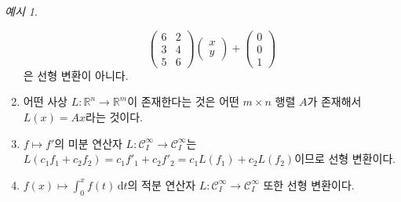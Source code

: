 \documentclass[unfonts,oneside,a4paper]{oblivoir}
\theoremstyle{definition}
\theoremstyle{theorem}
\theoremstyle{remark}
\theoremstyle{remark}
\theoremstyle{remark}
\newtheorem*{example}{예시}
\theoremstyle{remark}
\renewcommand{\vec}[1]{\bm{\mathit{#1}}}
\newcommand{\dd}{\mathrm{d}}
\begin{document}
\begin{example}
\begin{enumerate}
\begin{equation*}
\begin{pmatrix}
                    6 & 2 \\ 3 & 4 \\ 5 & 6
                    \end{pmatrix} \begin{pmatrix}
                    x \\ y
                    \end{pmatrix} + \begin{pmatrix}
                    0 \\ 0 \\ 1
                \end{pmatrix}
            \end{equation*}
            은 선형 변환이 아니다.
        \item 어떤 사상 $L: \mathbb R^n \rightarrow \mathbb R^m$이 존재한다는 것은 어떤 $m \times n$ 행렬 $A$가 존재해서 $L(\vec x) = A \vec x$라는 것이다.
        \item $f \mapsto f'$의 미분 연산자 $L: \mathcal C^\infty_I \rightarrow \mathcal C^\infty_I$는 $L(c_1 f_1 + c_2 f_2) = c_1 f'_1 + c_2 f'_2 = c_1 L(f_1) + c_2 L(f_2)$이므로 선형 변환이다.
        \item $f(x) \mapsto \int_0^x f(t)\, \dd t$의 적분 연산자 $L: \mathcal C^\infty_I \rightarrow \mathcal C^\infty_I$ 또한 선형 변환이다.
    \end{enumerate}
\end{example}
\end{document}
